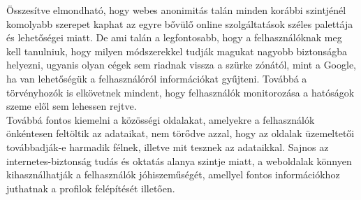 
Összesítve elmondható, hogy webes anonimitás talán minden korábbi szintjénél komolyabb szerepet kaphat az egyre bővülő online szolgáltatások széles palettája és lehetőségei miatt. De ami talán a legfontosabb, hogy a felhasználóknak meg kell tanulniuk, hogy milyen módszerekkel tudják magukat nagyobb biztonságba helyezni, ugyanis olyan cégek sem riadnak vissza a szürke zónától, mint a Google, ha van lehetőségük a felhasználóról információkat gyűjteni. Továbbá a törvényhozók is elkövetnek mindent, hogy felhasználók monitorozása a hatóságok szeme elől sem lehessen rejtve.\hfill\\
Továbbá fontos kiemelni a közösségi oldalakat, amelyekre a felhasználók önkéntesen feltöltik az adataikat, nem törődve azzal, hogy az oldalak üzemeltetői továbbadják-e harmadik félnek, illetve mit tesznek az adataikkal. Sajnos az internetes-biztonság tudás és oktatás alanya szintje miatt, a weboldalak könnyen kihasználhatják a felhasználók jóhiszeműségét, amellyel fontos információkhoz juthatnak a profilok felépítését illetően.
